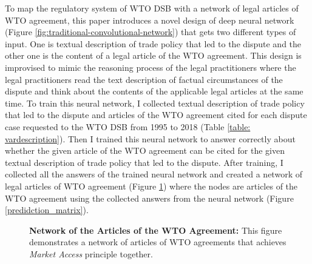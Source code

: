 To map the regulatory system of WTO DSB with 
a network of legal articles of WTO agreement,
this paper introduces a novel design of deep neural network (Figure \ref{fig:traditional-convolutional-network}) that
gets two different types of input.
One is textual description of trade policy that led to the dispute and
the other one is the content of a legal article of the WTO agreement.
This design is improvised to mimic
the reasoning process of the legal practitioners
where the legal practitioners read
the text description of
factual circumstances of the dispute and think about the contents of
the applicable legal articles at the same time.
To train this neural network, I collected textual description of trade policy 
that led to the dispute and articles of the WTO agreement cited for each dispute
case requested to the WTO DSB 
from 1995 to 2018 (Table \ref{table: vardescription}).
Then I trained this neural network to answer correctly 
about whether the given article of the WTO agreement
can be cited for the given textual description of 
trade policy that led to the dispute.
After training, I collected all the answers of the trained neural network 
and created a network of legal articles of WTO agreement (Figure \ref{fig:market-aceess_directed}) where 
the nodes are articles of the WTO agreement using 
the collected answers from the neural network (Figure \ref{predidction_matrix}).


\begin{figure}
    \centering{
      
    }
    \caption{{\bf Network of the Articles of the WTO Agreement:} 
    This figure demonstrates a network of articles of WTO agreements
    that achieves \textit{Market Access} principle together.
    }
    \label{fig:market-aceess_directed}
  \end{figure}
  






